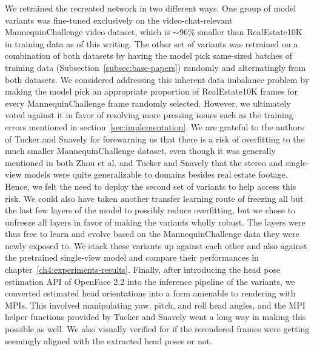 We retrained the recreated network in two different ways. One group of model variants was fine-tuned exclusively on the video-chat-relevant MannequinChallenge video dataset, which is $\sim$96\% smaller than RealEstate10K in training data as of this writing. The other set of variants was retrained on a combination of both datasets by having the model pick same-sized batches of training data (Subsection~\ref{subsec:base-papers}) randomly and alternatingly from both datasets. We considered addressing this inherent data imbalance problem by making the model pick an appropriate proportion of RealEstate10K frames for every MannequinChallenge frame randomly selected. However, we ultimately voted against it in favor of resolving more pressing issues such as the training errors mentioned in section~\ref{sec:implementation}. We are grateful to the authors of Tucker and Snavely for forewarning us that there is a risk of overfitting to the much smaller MannequinChallenge dataset, even though it was generally mentioned in both Zhou et al. and Tucker and Snavely that the stereo and single-view models were quite generalizable to domains besides real estate footage. Hence, we felt the need to deploy the second set of variants to help access this risk. We could also have taken another transfer learning route of freezing all but the last few layers of the model to possibly reduce overfitting, but we chose to unfreeze all layers in favor of making the variants wholly robust. The layers were thus free to learn and evolve based on the MannequinChallenge data they were newly exposed to. We stack these variants up against each other and also against the pretrained single-view model and compare their performances in chapter~\ref{ch4:experiments-results}. Finally, after introducing the head pose estimation API of OpenFace 2.2 into the inference pipeline of the variants, we converted estimated head orientations into a form amenable to rendering with MPIs. This involved manipulating yaw, pitch, and roll head angles, and the MPI helper functions provided by Tucker and Snavely went a long way in making this possible as well. We also visually verified for if the rerendered frames were getting seemingly aligned with the extracted head poses or not.





